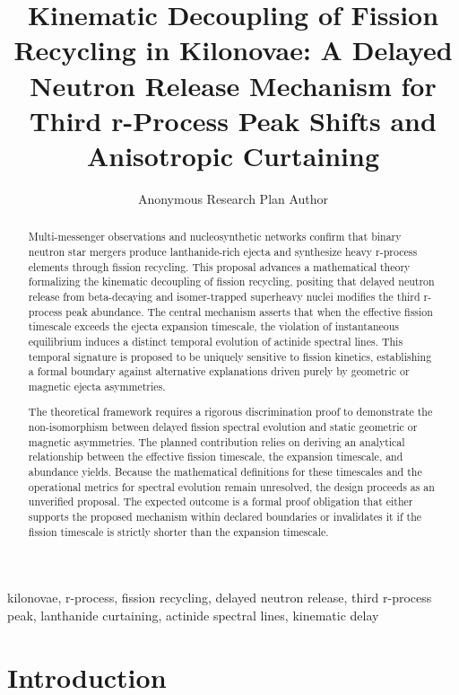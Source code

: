 \documentclass[conference]{IEEEtran}
\begin{document}
\title{Kinematic Decoupling of Fission Recycling in Kilonovae: A Delayed Neutron Release Mechanism for Third r-Process Peak Shifts and Anisotropic Curtaining}\author{Anonymous Research Plan Author}\maketitle

\begin{abstract}
Multi-messenger observations and nucleosynthetic networks confirm that binary neutron star mergers produce lanthanide-rich ejecta and synthesize heavy r-process elements through fission recycling. This proposal advances a mathematical theory formalizing the kinematic decoupling of fission recycling, positing that delayed neutron release from beta-decaying and isomer-trapped superheavy nuclei modifies the third r-process peak abundance. The central mechanism asserts that when the effective fission timescale exceeds the ejecta expansion timescale, the violation of instantaneous equilibrium induces a distinct temporal evolution of actinide spectral lines. This temporal signature is proposed to be uniquely sensitive to fission kinetics, establishing a formal boundary against alternative explanations driven purely by geometric or magnetic ejecta asymmetries.

The theoretical framework requires a rigorous discrimination proof to demonstrate the non-isomorphism between delayed fission spectral evolution and static geometric or magnetic asymmetries. The planned contribution relies on deriving an analytical relationship between the effective fission timescale, the expansion timescale, and abundance yields. Because the mathematical definitions for these timescales and the operational metrics for spectral evolution remain unresolved, the design proceeds as an unverified proposal. The expected outcome is a formal proof obligation that either supports the proposed mechanism within declared boundaries or invalidates it if the fission timescale is strictly shorter than the expansion timescale.
\end{abstract}
\begin{IEEEkeywords}
kilonovae, r-process, fission recycling, delayed neutron release, third r-process peak, lanthanide curtaining, actinide spectral lines, kinematic delay
\end{IEEEkeywords}\section{Introduction}
\end{document}
